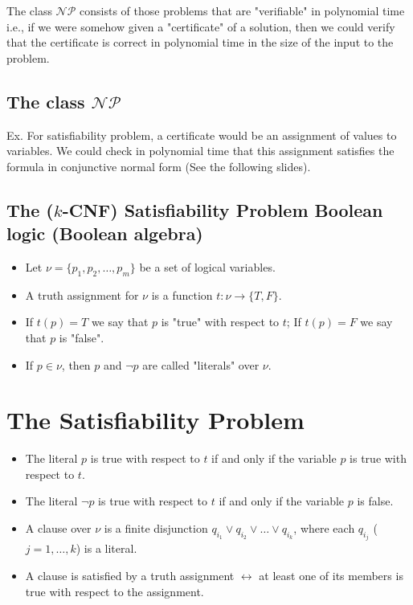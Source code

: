 \documentclass[12pt,openany]{book}
\theoremstyle{definition}
\begin{document}
	The class \( \mathcal{NP} \) consists of those problems that are "verifiable" in polynomial time i.e., if we were somehow given a "certificate" of a solution, then we could verify that the certificate is correct in polynomial time in the size of the input to the problem.
	
	\subsection{The class \( \mathcal{NP} \)}
	
	Ex. For satisfiability problem, a certificate would be an assignment of values to variables. We could check in polynomial time that this assignment satisfies the formula in conjunctive normal form (See the following slides).
	
	\subsection*{The (\(k\)-CNF) Satisfiability Problem Boolean logic (Boolean algebra)}
	
	\begin{itemize}
		\item Let \( \nu = \{p_1, p_2, \ldots, p_m\} \) be a set of logical variables.
		\item A truth assignment for \( \nu \) is a function \( t: \nu \rightarrow \{T, F\} \).
		\item If \( t(p) = T \) we say that \( p \) is "true" with respect to \( t \); If \( t(p) = F \) we say that \( p \) is "false".
		\item If \( p \in \nu \), then \( p \) and \( \neg p \) are called "literals" over \( \nu \).
	\end{itemize}
	
	\newpage
	\section{The Satisfiability Problem}
	
	\begin{itemize}
		\item The literal \( p \) is true with respect to \( t \) if and only if the variable \( p \) is true with respect to \( t \).
		\item The literal \( \neg p \) is true with respect to \( t \) if and only if the variable \( p \) is false.
		\item A clause over \( \nu \) is a finite disjunction \( q_{i_1} \lor q_{i_2} \lor \ldots \lor q_{i_k} \), where each \( q_{i_j} \) (\(j = 1, \ldots, k\)) is a literal.
		\item A clause is satisfied by a truth assignment \( \leftrightarrow \) at least one of its members is true with respect to the assignment.
	\end{itemize}
	
\end{document}
